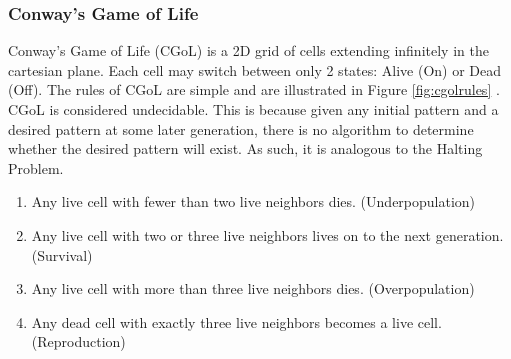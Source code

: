 \subsubsection{Conway's Game of Life}\label{subsubsec:CGoL}

Conway's Game of Life (CGoL) is a 2D grid of cells extending infinitely in the cartesian plane.
Each cell may switch between only 2 states: Alive (On) or Dead (Off).
The rules of CGoL are simple and are illustrated in Figure \ref{fig:cgolrules} \cite{CGoLImg}.
CGoL is considered undecidable.
This is because given any initial pattern and a desired pattern at some later generation, there is no algorithm to determine whether the desired pattern will exist.
As such, it is analogous to the Halting Problem.

\begin{enumerate}
    \item Any live cell with fewer than two live neighbors dies. (Underpopulation)
    \item Any live cell with two or three live neighbors lives on to the next generation. (Survival)
    \item Any live cell with more than three live neighbors dies. (Overpopulation)
    \item Any dead cell with exactly three live neighbors becomes a live cell. (Reproduction)
\end{enumerate}

